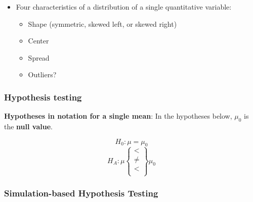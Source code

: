 \documentclass[
]{report}
\newenvironment{Shaded}{\begin{snugshade}}{\end{snugshade}}
\newcommand{\AttributeTok}[1]{\textcolor[rgb]{0.13,0.29,0.53}{#1}}
\newcommand{\CommentTok}[1]{\textcolor[rgb]{0.56,0.35,0.01}{\textit{#1}}}
\newcommand{\FunctionTok}[1]{\textcolor[rgb]{0.13,0.29,0.53}{\textbf{#1}}}
\newcommand{\NormalTok}[1]{#1}
\newcommand{\SpecialCharTok}[1]{\textcolor[rgb]{0.81,0.36,0.00}{\textbf{#1}}}
\newcommand{\StringTok}[1]{\textcolor[rgb]{0.31,0.60,0.02}{#1}}
\begin{document}
\begin{itemize}
\begin{Shaded}
\begin{Highlighting}[]
\NormalTok{object }\SpecialCharTok{\%\textgreater{}\%} \CommentTok{\# Data set piped into...}
    \FunctionTok{ggplot}\NormalTok{(}\FunctionTok{aes}\NormalTok{(}\AttributeTok{x =}\NormalTok{ variable)) }\SpecialCharTok{+} \CommentTok{\# Name variable to plot}
    \FunctionTok{geom\_dotplot}\NormalTok{() }\SpecialCharTok{+} \CommentTok{\# Create dotplot }
    \FunctionTok{labs}\NormalTok{(}\AttributeTok{title =} \StringTok{"Don\textquotesingle{}t forget to title the plot!"}\NormalTok{, }\CommentTok{\# Title for plot}
        \AttributeTok{x =} \StringTok{"x{-}axis label"}\NormalTok{, }\CommentTok{\# Label for x axis}
        \AttributeTok{y =} \StringTok{"y{-}axis label"}\NormalTok{) }\CommentTok{\# Label for y axis}
\end{Highlighting}
\end{Shaded}
\item
  Four characteristics of a distribution of a single quantitative variable:

  \begin{itemize}
  \item
    Shape (symmetric, skewed left, or skewed right)
  \item
    Center
  \item
    Spread
  \item
    Outliers?
  \end{itemize}
\end{itemize}

\subsubsection*{Hypothesis testing}\label{hypothesis-testing}

\textbf{Hypotheses in notation for a single mean}: In the hypotheses below, \(\mu_0\) is the \textbf{null value}.

\[H_0: \mu = \mu_0\]
\[H_A: \mu\left\{
\begin{array}{ll}
< \\
\ne \\
< \\
\end{array}
\right\}
\mu_0 \]

\subsubsection*{Simulation-based Hypothesis Testing}\label{simulation-based-hypothesis-testing}
\end{document}
